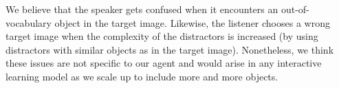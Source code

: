 \documentclass{article}
\begin{document}
We believe that the speaker gets confused when it encounters an out-of-vocabulary object in the target image. Likewise, the listener chooses a wrong target image when the complexity of the distractors is increased (by using distractors with similar objects as in the target image). Nonetheless, we think these issues are not specific to our agent and would arise in any interactive learning model as we scale up to include more and more objects.
\end{document}

